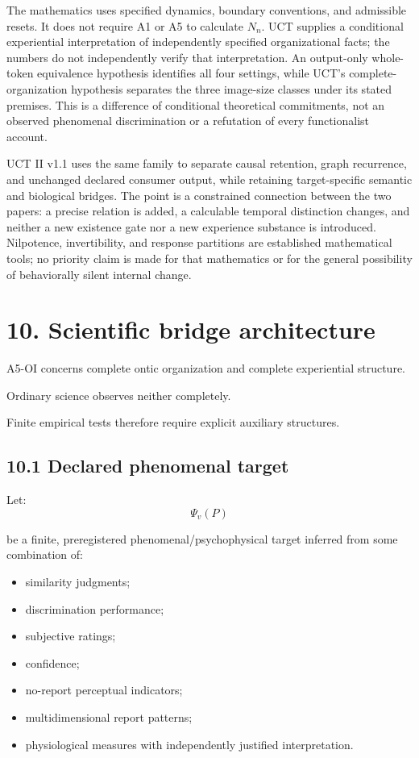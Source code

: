 \documentclass[
  11pt,
  a4paper,
]{article}
\providecommand{\tightlist}{%
  \setlength{\itemsep}{0pt}\setlength{\parskip}{0pt}}
\begin{document}
The mathematics uses specified dynamics, boundary conventions, and
admissible resets. It does not require A1 or A5 to calculate \(N_n\).
UCT supplies a conditional experiential interpretation of independently
specified organizational facts; the numbers do not independently verify
that interpretation. An output-only whole-token equivalence hypothesis
identifies all four settings, while UCT's complete-organization
hypothesis separates the three image-size classes under its stated
premises. This is a difference of conditional theoretical commitments,
not an observed phenomenal discrimination or a refutation of every
functionalist account.

UCT II v1.1 uses the same family to separate causal retention, graph
recurrence, and unchanged declared consumer output, while retaining
target-specific semantic and biological bridges. The point is a
constrained connection between the two papers: a precise relation is
added, a calculable temporal distinction changes, and neither a new
existence gate nor a new experience substance is introduced. Nilpotence,
invertibility, and response partitions are established mathematical
tools; no priority claim is made for that mathematics or for the general
possibility of behaviorally silent internal change.

\hypertarget{scientific-bridge-architecture}{%
\section{10. Scientific bridge
architecture}\label{scientific-bridge-architecture}}

A5-OI concerns complete ontic organization and complete experiential
structure.

Ordinary science observes neither completely.

Finite empirical tests therefore require explicit auxiliary structures.

\hypertarget{declared-phenomenal-target}{%
\subsection{10.1 Declared phenomenal
target}\label{declared-phenomenal-target}}

Let:
\nopagebreak[4]
\[
\Psi_v(P)
\]

be a finite, preregistered phenomenal/psychophysical target inferred
from some combination of:

\begin{itemize}
\tightlist
\item
  similarity judgments;
\item
  discrimination performance;
\item
  subjective ratings;
\item
  confidence;
\item
  no-report perceptual indicators;
\item
  multidimensional report patterns;
\item
  physiological measures with independently justified interpretation.
\end{itemize}
\end{document}
